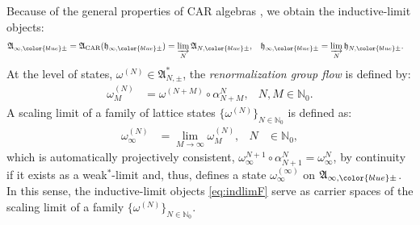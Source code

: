 \documentclass[a4paper, 11pt]{article}
\newcommand{\fA}{\mathfrak{A}}\newcommand{\cA}{\mathcal{A}}\newcommand{\dA}{\mathds{A}}\newcommand{\sA}{\mathscr{A}}
\newcommand{\fh}{\mathfrak{h}}
\newcommand{\NN}{\mathbb{N}}\newcommand{\N}{\mathbb{N}}
\DeclareMathOperator{\1}{\mathds{1}}
\DeclareMathOperator{\CAR}{\textup{CAR}}
\begin{document}
Because of the general properties of CAR algebras \cite{BratteliOperatorAlgebrasAnd2, EvansQuantumSymmetriesOn}, we obtain the inductive-limit objects:
\begin{align}
\label{eq:indlimF}
\fA_{\infty,{\color{blue}\pm}} & = \fA_{\CAR}(\fh_{\infty,{\color{blue}\pm}}) = \varinjlim_{N}\fA_{N,{\color{blue}\pm}}, & \fh_{\infty,{\color{blue}\pm}} & = \varinjlim_{N}\fh_{N,{\color{blue}\pm}}.
\end{align}
At the level of states, $\omega^{(N)}\in\fA^{*}_{N,\pm}$, the \textit{renormalization group flow} is defined by:
\begin{align}
\label{eq:rgflow}
\omega^{(N)}_{M} & = \omega^{(N+M)}\circ\alpha^{N}_{N+M}, & N,M\in\NN_{0}.
\end{align}
A scaling limit of a family of lattice states $\{\omega^{(N)}\}_{N\in\N_{0}}$ is defined as:
\begin{align}
\label{eq:sl}
\omega^{(N)}_{\infty} & = \lim_{M\rightarrow\infty}\omega^{(N)}_{M}, & N & \in\N_{0},
\end{align}
which is automatically projectively consistent, $\omega^{N+1}_{\infty}\circ\alpha^{N}_{N+1} = \omega^{N}_{\infty}$, by continuity \cite{MorinelliScalingLimitsOf, BrothierAnOperatorAlgebraic} if it exists as a weak$^{*}$-limit and, thus, defines a state $\omega^{(\infty)}_{\infty}$ on $\fA_{\infty,{\color{blue}\pm}}$. In this sense, the inductive-limit objects \eqref{eq:indlimF} serve as carrier spaces of the scaling limit of a family $\{\omega^{(N)}\}_{N\in\N_{0}}$.
\end{document}
